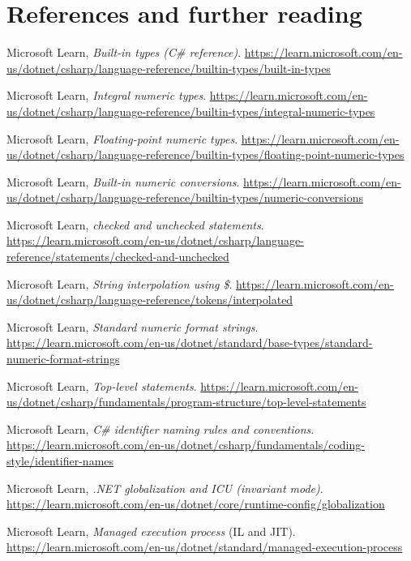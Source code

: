 \section*{References and further reading}
\begin{enumerate}[label={[\arabic*]},leftmargin=*,itemsep=0pt,font=\footnotesize]\footnotesize
  \item Microsoft Learn, \emph{Built-in types (C\# reference)}. \url{https://learn.microsoft.com/en-us/dotnet/csharp/language-reference/builtin-types/built-in-types}
  \item Microsoft Learn, \emph{Integral numeric types}. \url{https://learn.microsoft.com/en-us/dotnet/csharp/language-reference/builtin-types/integral-numeric-types}
  \item Microsoft Learn, \emph{Floating-point numeric types}. \url{https://learn.microsoft.com/en-us/dotnet/csharp/language-reference/builtin-types/floating-point-numeric-types}
  \item Microsoft Learn, \emph{Built-in numeric conversions}. \url{https://learn.microsoft.com/en-us/dotnet/csharp/language-reference/builtin-types/numeric-conversions}
  \item Microsoft Learn, \emph{checked and unchecked statements}. \url{https://learn.microsoft.com/en-us/dotnet/csharp/language-reference/statements/checked-and-unchecked}
  \item Microsoft Learn, \emph{String interpolation using \$}. \url{https://learn.microsoft.com/en-us/dotnet/csharp/language-reference/tokens/interpolated}
  \item Microsoft Learn, \emph{Standard numeric format strings}. \url{https://learn.microsoft.com/en-us/dotnet/standard/base-types/standard-numeric-format-strings}
  \item Microsoft Learn, \emph{Top-level statements}. \url{https://learn.microsoft.com/en-us/dotnet/csharp/fundamentals/program-structure/top-level-statements}
  \item Microsoft Learn, \emph{C\# identifier naming rules and conventions}. \url{https://learn.microsoft.com/en-us/dotnet/csharp/fundamentals/coding-style/identifier-names}
  \item Microsoft Learn, \emph{.NET globalization and ICU (invariant mode)}. \url{https://learn.microsoft.com/en-us/dotnet/core/runtime-config/globalization}
  \item Microsoft Learn, \emph{Managed execution process} (IL and JIT). \url{https://learn.microsoft.com/en-us/dotnet/standard/managed-execution-process}
\end{enumerate}


